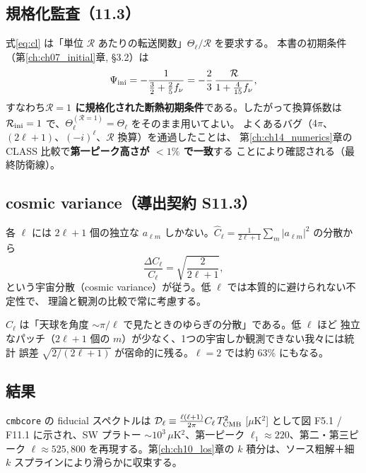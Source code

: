 \subsection{規格化監査（11.3）}
式\eqref{eq:cl} は「単位 $\mathcal R$ あたりの転送関数」$\Theta_\ell/\mathcal R$ を要求する。
本書の初期条件（第\ref{ch:ch07_initial}章, \S3.2）は
\begin{equation}
  \Psi_{\rm ini}=-\frac{1}{\tfrac32+\tfrac25 f_\nu}=-\frac{2}{3}\,\frac{\mathcal R}{1+\tfrac{4}{15}f_\nu},
\end{equation}
すなわち\textbf{$\mathcal R=1$ に規格化された断熱初期条件}である。したがって換算係数は
$\mathcal R_{\rm ini}=1$ で、$\Theta_\ell^{(\mathcal R=1)}=\Theta_\ell$ をそのまま用いてよい。
よくあるバグ（$4\pi$、$(2\ell+1)$、$(-i)^\ell$、$\mathcal R$ 換算）を通過したことは、
第\ref{ch:ch14_numerics}章の CLASS 比較で\textbf{第一ピーク高さが $<1\%$ で一致}する
ことにより確認される（最終防衛線）。

\subsection{cosmic variance（導出契約 S11.3）}
各 $\ell$ には $2\ell+1$ 個の独立な $a_{\ell m}$ しかない。$\hat C_\ell=\frac{1}{2\ell+1}
\sum_m|a_{\ell m}|^2$ の分散から
\begin{equation}
  \frac{\Delta C_\ell}{C_\ell}=\sqrt{\frac{2}{2\ell+1}},
\end{equation}
という宇宙分散（cosmic variance）が従う。低 $\ell$ では本質的に避けられない不定性で、
理論と観測の比較で常に考慮する。

\begin{intuition}
$C_\ell$ は「天球を角度 $\sim\pi/\ell$ で見たときのゆらぎの分散」である。低 $\ell$ ほど
独立なパッチ（$2\ell+1$ 個の $m$）が少なく、1つの宇宙しか観測できない我々には統計
誤差 $\sqrt{2/(2\ell+1)}$ が宿命的に残る。$\ell=2$ では約 $63\%$ にもなる。
\end{intuition}

\subsection{結果}
\texttt{cmbcore} の fiducial スペクトルは
$\mathcal D_\ell\equiv\frac{\ell(\ell+1)}{2\pi}C_\ell\,T_{\rm CMB}^2$ [$\mu$K$^2$]
として図 F5.1 / F11.1 に示され、SW プラトー $\sim10^3\,\mu$K$^2$、第一ピーク
$\ell_1\approx220$、第二・第三ピーク $\ell\approx525,800$ を再現する。第\ref{ch:ch10_los}章の
$k$ 積分は、ソース粗解＋細 $k$ スプラインにより滑らかに収束する。

